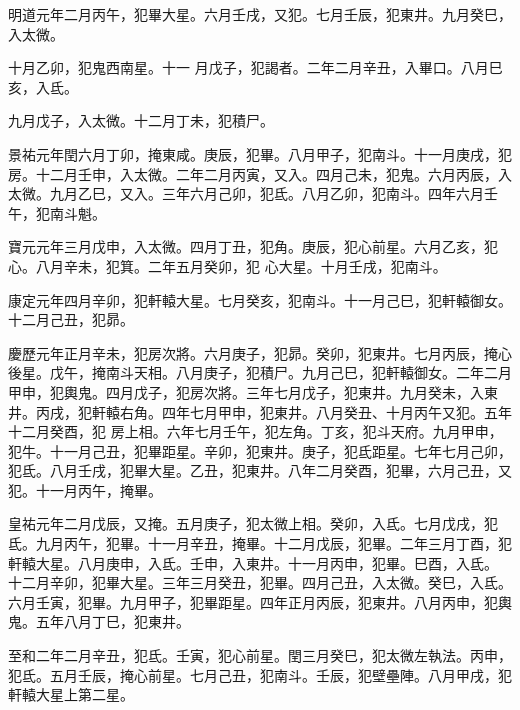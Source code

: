 \begin{pinyinscope}
 明道元年二月丙午，犯畢大星。六月壬戌，又犯。七月壬辰，犯東井。九月癸巳，入太微。



 十月乙卯，犯鬼西南星。十一
 月戊子，犯謁者。二年二月辛丑，入畢口。八月巳亥，入氐。



 九月戊子，入太微。十二月丁未，犯積尸。



 景祐元年閏六月丁卯，掩東咸。庚辰，犯畢。八月甲子，犯南斗。十一月庚戌，犯房。十二月壬申，入太微。二年二月丙寅，又入。四月己未，犯鬼。六月丙辰，入太微。九月乙巳，又入。三年六月己卯，犯氐。八月乙卯，犯南斗。四年六月壬午，犯南斗魁。



 寶元元年三月戊申，入太微。四月丁丑，犯角。庚辰，犯心前星。六月乙亥，犯心。八月辛未，犯箕。二年五月癸卯，犯
 心大星。十月壬戌，犯南斗。



 康定元年四月辛卯，犯軒轅大星。七月癸亥，犯南斗。十一月己巳，犯軒轅御女。十二月己丑，犯昴。



 慶歷元年正月辛未，犯房次將。六月庚子，犯昴。癸卯，犯東井。七月丙辰，掩心後星。戊午，掩南斗天相。八月庚子，犯積尸。九月己巳，犯軒轅御女。二年二月甲申，犯輿鬼。四月戊子，犯房次將。三年七月戊子，犯東井。九月癸未，入東井。丙戌，犯軒轅右角。四年七月甲申，犯東井。八月癸丑、十月丙午又犯。五年十二月癸酉，犯
 房上相。六年七月壬午，犯左角。丁亥，犯斗天府。九月甲申，犯牛。十一月己丑，犯畢距星。辛卯，犯東井。庚子，犯氐距星。七年七月己卯，犯氐。八月壬戌，犯畢大星。乙丑，犯東井。八年二月癸酉，犯畢，六月己丑，又犯。十一月丙午，掩畢。



 皇祐元年二月戊辰，又掩。五月庚子，犯太微上相。癸卯，入氐。七月戊戌，犯氐。九月丙午，犯畢。十一月辛丑，掩畢。十二月戊辰，犯畢。二年三月丁酉，犯軒轅大星。八月庚申，入氐。壬申，入東井。十一月丙申，犯畢。巳酉，入氐。
 十二月辛卯，犯畢大星。三年三月癸丑，犯畢。四月己丑，入太微。癸巳，入氐。六月壬寅，犯畢。九月甲子，犯畢距星。四年正月丙辰，犯東井。八月丙申，犯輿鬼。五年八月丁巳，犯東井。



 至和二年二月辛丑，犯氐。壬寅，犯心前星。閏三月癸巳，犯太微左執法。丙申，犯氐。五月壬辰，掩心前星。七月己丑，犯南斗。壬辰，犯壁壘陣。八月甲戌，犯軒轅大星上第二星。




\end{pinyinscope}
